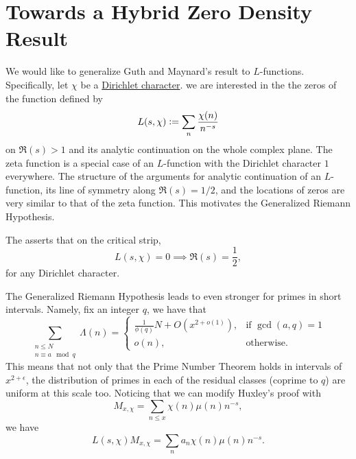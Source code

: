 \section{Towards a Hybrid Zero Density Result}
\iffalse

\textit{Here I will document some progress with working with
the hybrid version of Guth-Maynard. This section will be removed when I send the draft to Prof. Wunsch.}
\fi
We would like to generalize Guth and Maynard's result to $L$-functions. Specifically, let $\chi$ be a \hyperref[dcharacter]{Dirichlet character}. we are interested in the the zeros of the function defined by \[
L(s,\chi)\mathrel{\mathop:}=\sum_{n} \frac{\chi(n)}{n^{-s}}
\]
on $\Re(s)>1$ and its analytic continuation on the whole complex plane. The zeta function is a special case of an $L$-function with the Dirichlet character $1$ everywhere. The structure of the arguments for analytic continuation of an $L$-function, its line of symmetry along $\Re(s) = 1/2$, and the locations of zeros are very similar to that of the zeta function. This motivates the Generalized Riemann Hypothesis. \begin{conjecture} 
    The  asserts that on the critical strip, \[
    L(s,\chi)=0 \implies \Re(s)=\frac{1}{2},
    \]
    for any Dirichlet character.
\end{conjecture}
The Generalized Riemann Hypothesis leads to even stronger for primes in short intervals. Namely, fix an integer $q$, we have that \[
\sum_{\substack{n\leq N\\ n\equiv a\mod q}}\Lambda(n) = \begin{cases}
    \frac{1}{\phi(q)} N + O(x^{2+o(1)}), & \textrm{if $\gcd(a,q)=1$}\\
    o(n),& \textrm{otherwise.}
\end{cases}
\]
This means that not only that the Prime Number Theorem holds in intervals of $x^{2+\epsilon}$, the distribution of primes in each of the residual classes (coprime to $q$) are uniform at this scale too. Noticing that we can modify Huxley's proof with \[
M_{x,\chi} = \sum_{n\leq x} \chi(n) \mu(n) n^{-s},
\]
we have \[
L(s,\chi)M_{x,\chi} = \sum_{n} a_n \chi(n) \mu(n) n^{-s}.
\]


